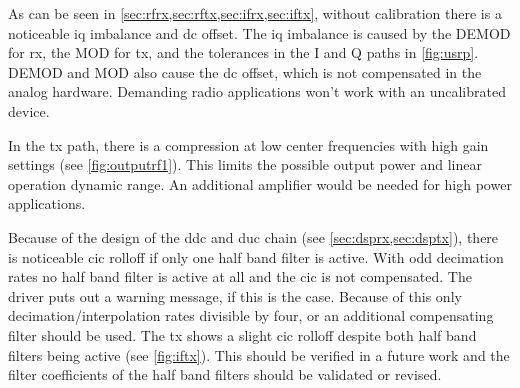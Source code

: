 \documentclass[12pt,a4paper,parskip=full,abstracton]{scrartcl}
\begin{document}
As can be seen in \cref{sec:rfrx,sec:rftx,sec:ifrx,sec:iftx}, without calibration
there is a noticeable \gls{iq} imbalance and \gls{dc} offset. The \gls{iq} imbalance
is caused by the DEMOD for \gls{rx}, the MOD for \gls{tx}, and the tolerances
in the I and Q paths in \cref{fig:usrp}. DEMOD and MOD also cause the \gls{dc} offset,
which is not compensated in the analog hardware. Demanding radio applications
won't work with an uncalibrated device.

In the \Gls{tx} path, there is a compression at low center frequencies with high
gain settings (see \cref{fig:outputrf1}). This limits the possible output power and
linear operation dynamic range. An additional amplifier would be needed for high
power applications.

Because of the design of the \gls{ddc} and \gls{duc} chain (see
\cref{sec:dsprx,sec:dsptx}), there is noticeable \gls{cic} rolloff if only one
half band filter is active. With odd decimation rates no half band filter is
active at all and the \gls{cic} is not compensated. The driver puts out a warning
message, if this is the case. Because of this only decimation/interpolation rates
divisible by four, or an additional compensating filter should be used. The \gls{tx} shows
a slight \gls{cic} rolloff despite both half band filters being active (see
\cref{fig:iftx}). This should be verified in a future work and the filter
coefficients of the half band filters should be validated or revised.
\end{document}
